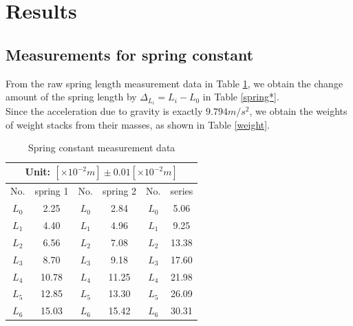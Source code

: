 \section{Results}
\subsection{Measurements for spring constant}
    From the raw spring length measurement data in Table \ref{spring}, we obtain the change amount of the spring length by $\Delta_{L_i}=L_i-L_0$ in Table \ref{spring*}.\\
    Since the acceleration due to gravity is exactly $9.794m/s^2$, we obtain the weights of weight stacks from their masses, as shown in Table \ref{weight}.\\
    
    \begin{table}[htbp]
        \centering
        \label{spring}
        \begin{tabular}{|c|c|c|c|c|c|}
            \hline
            \multicolumn{6}{|c|}{Unit: $[\times 10^{-2}m]\pm 0.01[\times 10^{-2}m]$}\\ \hline
            No. & spring 1 & No. & spring 2 & No. & series\\ \hline
            $L_0$ & 2.25 & $L_0$ & 2.84 & $L_0$ & 5.06\\ \hline
            $L_1$ & 4.40 & $L_1$ & 4.96	& $L_1$ & 9.25\\ \hline
            $L_2$ & 6.56 & $L_2$ & 7.08 & $L_2$ & 13.38\\ \hline
            $L_3$ & 8.70 & $L_3$ & 9.18	& $L_3$ & 17.60\\ \hline
            $L_4$ & 10.78 & $L_4$ & 11.25 & $L_4$ & 21.98\\ \hline
            $L_5$ & 12.85 & $L_5$ & 13.30 & $L_5$ & 26.09\\ \hline
            $L_6$ & 15.03 & $L_6$ &	15.42 & $L_6$ &	30.31\\ \hline
        \end{tabular}
        \caption{Spring constant measurement data}
    \end{table}
